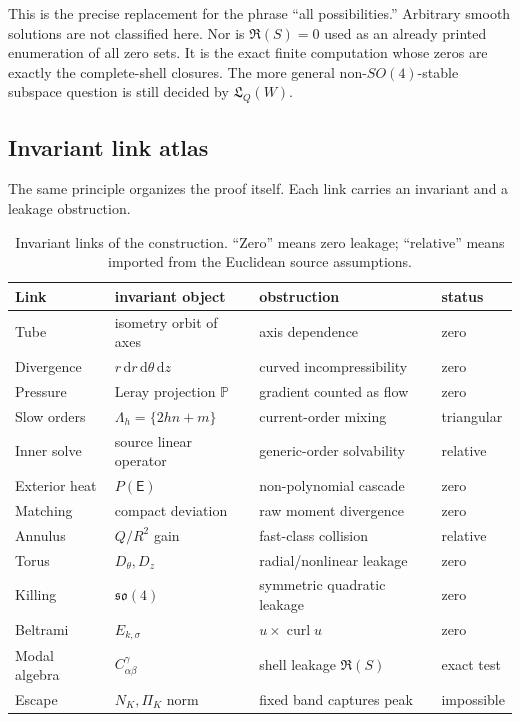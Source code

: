 \documentclass[aps,prd,reprint,superscriptaddress,nofootinbib,floatfix]{revtex4-2}
\theoremstyle{definition}
\theoremstyle{remark}
\newcommand{\dd}{\mathrm{d}}
\newcommand{\PP}{\mathbb{P}}
\begin{document}
This is the precise replacement for the phrase ``all possibilities.''  Arbitrary smooth solutions are not classified here.  Nor is \(\mathfrak R(S)=0\) used as an already printed enumeration of all zero sets.  It is the exact finite computation whose zeros are exactly the complete-shell closures.  The more general non-\(SO(4)\)-stable subspace question is still decided by \(\mathfrak L_Q(W)\).

\subsection{Invariant link atlas}

The same principle organizes the proof itself.  Each link carries an invariant and a leakage obstruction.

\begin{table}[t]
	\caption{Invariant links of the construction.  ``Zero'' means zero leakage; ``relative'' means imported from the Euclidean source assumptions.}
	\label{tab:invariant-links}
	\footnotesize
	\begin{tabular}{llll}
		\toprule
		Link          & invariant object               & obstruction                      & status     \\
		\midrule
		Tube          & isometry orbit of axes         & axis dependence                  & zero       \\
		Divergence    & \(r\,\dd r\,\dd\theta\,\dd z\) & curved incompressibility         & zero       \\
		Pressure      & Leray projection \(\PP\)       & gradient counted as flow         & zero       \\
		Slow orders   & \(\Lambda_h=\{2hn+m\}\)        & current-order mixing             & triangular \\
		Inner solve   & source linear operator         & generic-order solvability        & relative   \\
		Exterior heat & \(P(\mathsf E)\)               & non-polynomial cascade           & zero       \\
		Matching      & compact deviation              & raw moment divergence            & zero       \\
		Annulus       & \(Q/R^2\) gain                 & fast-class collision             & relative   \\
		Torus         & \(D_\theta,D_z\)               & radial/nonlinear leakage         & zero       \\
		Killing       & \(\mathfrak{so}(4)\)           & symmetric quadratic leakage      & zero       \\
		Beltrami      & \(E_{k,\sigma}\)               & \(u\times\operatorname{curl}u\)  & zero       \\
		Modal algebra & \(C_{\alpha\beta}^{\gamma}\)   & shell leakage \(\mathfrak R(S)\) & exact test \\
		Escape        & \(N_K,\Pi_K\) norm             & fixed band captures peak         & impossible \\
		\bottomrule
	\end{tabular}
\end{table}
\end{document}
